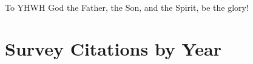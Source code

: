     To YHWH God the Father, the Son, and the Spirit, be the glory!






\appendix

\section{Survey Citations by Year}



